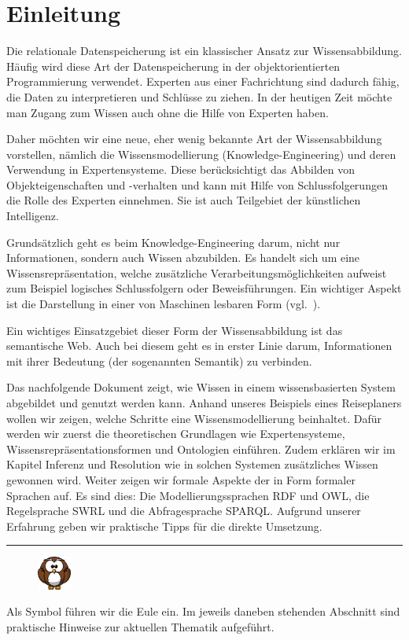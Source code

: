 \chapter{Einleitung}
\label{chap:einleitung}
Die relationale Datenspeicherung ist ein klassischer Ansatz zur Wissensabbildung. Häufig wird diese Art der Datenspeicherung in der objektorientierten Programmierung verwendet. Experten aus einer Fachrichtung sind dadurch fähig, die Daten zu interpretieren und Schlüsse zu ziehen. In der heutigen Zeit möchte man Zugang zum Wissen auch ohne die Hilfe von Experten haben. 

Daher möchten wir eine neue, eher wenig bekannte Art der Wissensabbildung vorstellen, nämlich die Wissensmodellierung (Knowledge-Engineering) und deren Verwendung in Expertensysteme. Diese berücksichtigt das Abbilden von Objekteigenschaften und -verhalten und kann mit Hilfe von Schlussfolgerungen die Rolle des Experten einnehmen. Sie ist auch Teilgebiet der künstlichen Intelligenz.

Grundsätzlich geht es beim Knowledge-Engineering darum, nicht nur Informationen, sondern auch Wissen abzubilden. Es handelt sich um eine Wissensrepräsentation, welche zusätzliche Verarbeitungsmöglichkeiten aufweist zum Beispiel logisches Schlussfolgern oder Beweisführungen. Ein wichtiger Aspekt ist die Darstellung in einer von Maschinen lesbaren Form (vgl.~\cite[S. 308]{ISpekOntoGeschichte}).

Ein wichtiges Einsatzgebiet dieser Form der Wissensabbildung ist das semantische Web. Auch bei diesem geht es in erster Linie darum, Informationen mit ihrer Bedeutung (der sogenannten Semantik) zu verbinden.

Das nachfolgende Dokument zeigt, wie Wissen in einem wissensbasierten System abgebildet und genutzt werden kann. Anhand unseres Beispiels eines Reiseplaners wollen wir zeigen, welche Schritte eine Wissensmodellierung beinhaltet. Dafür werden wir zuerst die theoretischen Grundlagen wie Expertensysteme, Wissensrepräsentationsformen und Ontologien einführen. Zudem erklären wir im Kapitel Inferenz und Resolution wie in solchen Systemen zusätzliches Wissen gewonnen wird. Weiter zeigen wir formale Aspekte der in Form formaler Sprachen auf. Es sind dies: Die Modellierungssprachen RDF und OWL, die Regelsprache SWRL und die Abfragesprache SPARQL. Aufgrund unserer Erfahrung geben wir praktische Tipps für die direkte Umsetzung.

\noindent\rule[1ex]{\textwidth}{1pt}
\begin{figure}
    \vspace{-12pt}
    \includegraphics[width=0.1\textwidth]{bilder/owl.png}\protect\footnotemark{}
\end{figure}
Als Symbol führen wir die Eule ein. Im jeweils daneben stehenden Abschnitt sind praktische Hinweise zur aktuellen Thematik aufgeführt.

